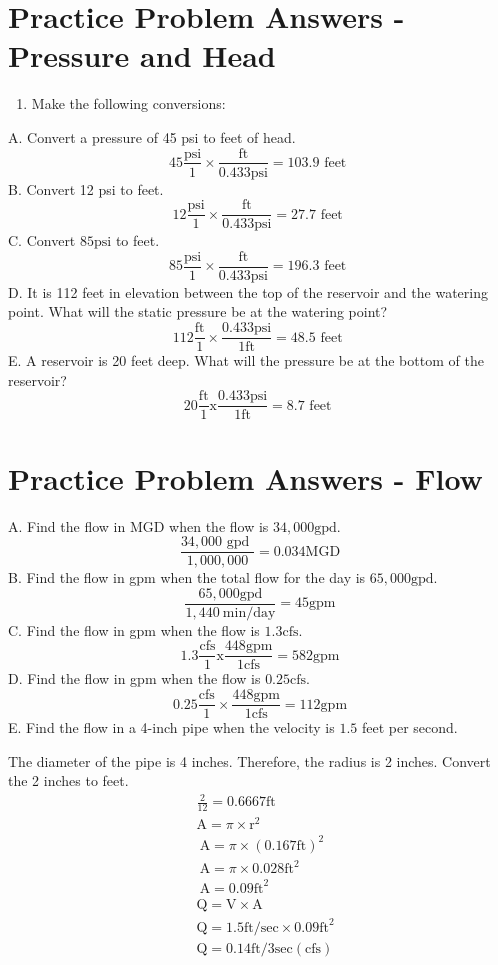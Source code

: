 \documentclass[10pt]{article}
\begin{document}
\section{Practice Problem Answers - Pressure and Head}
\begin{enumerate}
  \item Make the following conversions:
\end{enumerate}
A. Convert a pressure of 45 psi to feet of head.
$$
45 \frac{\mathrm{psi}}{1} \times \frac{\mathrm{ft}}{0.433 \mathrm{psi}}=103.9 \text { feet }
$$
B. Convert 12 psi to feet.
$$
12 \frac{\mathrm{psi}}{1} \times \frac{\mathrm{ft}}{0.433 \mathrm{psi}}=27.7 \text { feet }
$$
C. Convert $85 \mathrm{psi}$ to feet.
$$
85 \frac{\mathrm{psi}}{1} \times \frac{\mathrm{ft}}{0.433 \mathrm{psi}}=196.3 \text { feet }
$$
D. It is 112 feet in elevation between the top of the reservoir and the watering point. What will the static pressure be at the watering point?
$$
112 \frac{\mathrm{ft}}{1} \times \frac{0.433 \mathrm{psi}}{1 \mathrm{ft}}=48.5 \text { feet }
$$
E. A reservoir is 20 feet deep. What will the pressure be at the bottom of the reservoir?
$$
20 \frac{\mathrm{ft}}{1} \mathrm{x} \frac{0.433 \mathrm{psi}}{1 \mathrm{ft}}=8.7 \text { feet }
$$

\section{Practice Problem Answers - Flow}
A. Find the flow in MGD when the flow is $34,000 \mathrm{gpd}$.
$$
\frac{34,000 \text { gpd }}{1,000,000}=0.034 \mathrm{MGD}
$$
B. Find the flow in gpm when the total flow for the day is $65,000 \mathrm{gpd}$.
$$
\frac{65,000 \mathrm{gpd}}{1,440 \mathrm{~min} / \mathrm{day}}=45 \mathrm{gpm}
$$
C. Find the flow in gpm when the flow is $1.3 \mathrm{cfs}$.
$$
1.3 \frac{\mathrm{cfs}}{1} \mathrm{x} \frac{448 \mathrm{gpm}}{1 \mathrm{cfs}}=582 \mathrm{gpm}
$$
D. Find the flow in gpm when the flow is $0.25 \mathrm{cfs}$.
$$
0.25 \frac{\mathrm{cfs}}{1} \times \frac{448 \mathrm{gpm}}{1 \mathrm{cfs}}=112 \mathrm{gpm}
$$
E. Find the flow in a 4-inch pipe when the velocity is $1.5$ feet per second.

The diameter of the pipe is 4 inches. Therefore, the radius is 2 inches. Convert the 2 inches to feet.
$$
\begin{aligned}
&\frac{2}{12}=0.6667 \mathrm{ft} \\
&\mathrm{A}=\pi \times \mathrm{r}^{2} \\
&\mathrm{~A}=\pi \times(0.167 \mathrm{ft})^{2} \\
&\mathrm{~A}=\pi \times 0.028 \mathrm{ft}^{2} \\
&\mathrm{~A}=0.09 \mathrm{ft}^{2} \\
&\mathrm{Q}=\mathrm{V} \times \mathrm{A} \\
&\mathrm{Q}=1.5 \mathrm{ft} / \mathrm{sec} \times 0.09 \mathrm{ft}^{2} \\
&\mathrm{Q}=0.14 \mathrm{ft} / 3 \mathrm{sec}(\mathrm{cfs})
\end{aligned}
$$
\end{document}
